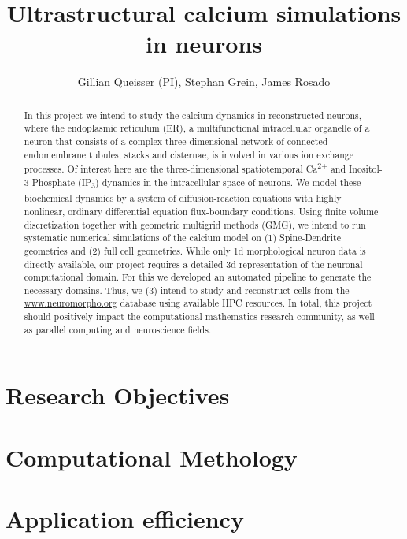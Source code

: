 \documentclass[a4paper, 10pt, notitlepage]{nsf}
\author{Gillian Queisser (PI), Stephan Grein, James Rosado}
\title{Ultrastructural calcium simulations in neurons}
\date{}
\begin{document}

\maketitle
\begin{abstract}
In this project we intend to study the calcium dynamics in reconstructed neurons, where the endoplasmic reticulum (ER), a multifunctional intracellular organelle of a neuron that consists of a complex three-dimensional network of connected endomembrane tubules, stacks and cisternae, is involved in various ion exchange processes. Of interest here are the three-dimensional spatiotemporal Ca\textsuperscript{2+} and Inositol-3-Phosphate (IP\textsubscript{3}) dynamics in the intracellular space of neurons. We model these biochemical dynamics by a system of diffusion-reaction equations with highly nonlinear, ordinary differential equation flux-boundary conditions. Using finite volume discretization together with geometric multigrid methods (GMG), we intend to run systematic numerical simulations of the calcium model on (1) Spine-Dendrite geometries and (2) full cell geometries. While only 1d morphological neuron data is directly available, our project requires a detailed 3d representation of the neuronal computational domain. For this we developed an automated pipeline to generate the necessary domains. Thus, we (3) intend to study and reconstruct cells from the \url{www.neuromorpho.org} database using available HPC resources. In total, this project should positively impact the computational mathematics research community, as well as parallel computing and neuroscience fields.
\end{abstract}


\section{Research Objectives}

%

\section{Computational Methology}


\section{Application efficiency}

% 
\end{document}
